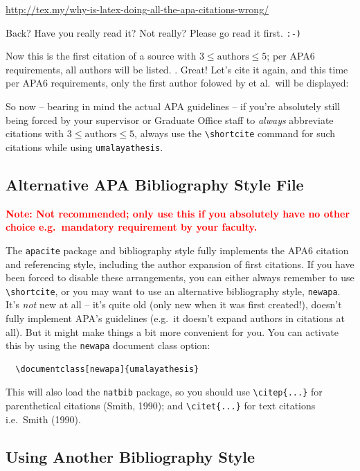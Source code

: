 \url{http://tex.my/why-is-latex-doing-all-the-apa-citations-wrong/}

Back? Have you really read it? Not really? Please go read it first. \texttt{:-)}

Now this is the first citation of a source with $3 \leq \text{authors} \leq 5$; per APA6 requirements, all authors will be listed. \cite{azarova:etal:2002}. Great! Let's cite it again, and this time per APA6 requirements, only the first author folowed by et al.~will be displayed: \cite{azarova:etal:2002}

So now -- bearing in mind the actual APA guidelines -- if you're absolutely still being forced by your supervisor or Graduate Office staff to \emph{always} abbreviate citations with $3 \leq \text{authors} \leq 5$, always use the \verb|\shortcite| command for such citations while using \texttt{umalayathesis}.

\subsection{Alternative APA Bibliography Style File}

\textcolor{red}{\textbf{Note: Not recommended; only use this if you absolutely have no other choice e.g.~mandatory requirement by your faculty.}}

The \texttt{apacite} package and bibliography style fully implements the APA6 citation and referencing style, including the author expansion of first citations. If you have been forced to disable these arrangements, you can either always remember to use \verb|\shortcite|, or you may want to use an alternative bibliography style, \texttt{newapa}. It's \emph{not} new at all -- it's quite old (only new when it was first created!), doesn't fully implement APA's guidelines (e.g.~it doesn't expand authors in citations at all). But it might make things a bit more convenient for you. You can activate this by using the \texttt{newapa} document class option:
\begin{verbatim}
  \documentclass[newapa]{umalayathesis}
\end{verbatim}

This will also load the \texttt{natbib} package, so you should use \verb|\citep{...}| for parenthetical citations (Smith, 1990); and \verb|\citet{...}| for text citations i.e.~Smith (1990).

\subsection{Using Another Bibliography Style}

